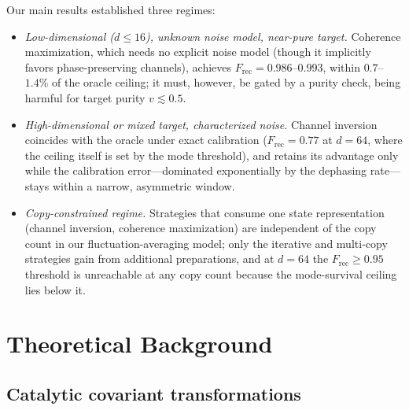 \documentclass[pra,twocolumn,superscriptaddress,longbibliography,floatfix,nofootinbib]{revtex4-2}
\newcommand{\Frec}{F_\mathrm{rec}}
\begin{document}
Our main results established three regimes:
\begin{itemize}
\item \emph{Low-dimensional ($d \leq 16$), unknown noise model, near-pure target.} Coherence maximization, which needs no explicit noise model (though it implicitly favors phase-preserving channels), achieves $\Frec = 0.986$--$0.993$, within $0.7$--$1.4\%$ of the oracle ceiling; it must, however, be gated by a purity check, being harmful for target purity $v \lesssim 0.5$.
\item \emph{High-dimensional or mixed target, characterized noise.} Channel inversion coincides with the oracle under exact calibration ($\Frec = 0.77$ at $d = 64$, where the ceiling itself is set by the mode threshold), and retains its advantage only while the calibration error---dominated exponentially by the dephasing rate---stays within a narrow, asymmetric window.
\item \emph{Copy-constrained regime.} Strategies that consume one state representation (channel inversion, coherence maximization) are independent of the copy count in our fluctuation-averaging model; only the iterative and multi-copy strategies gain from additional preparations, and at $d = 64$ the $\Frec \geq 0.95$ threshold is unreachable at any copy count because the mode-survival ceiling lies below it.
\end{itemize}


\section{Theoretical Background}
\label{sec:theory}

\subsection{Catalytic covariant transformations}
\label{sec:catalytic}
\end{document}
